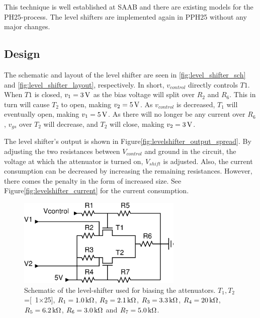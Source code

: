 		This technique is well established at SAAB and there are existing models for the PH25-process\autocite{gustavsson07}. The level shifters are implemented again in PPH25 without any major changes.
		
	\subsection{Design}
		The schematic and layout of the level shifter are seen in \autoref{fig:level_shifter_sch} and \autoref{fig:level_shifter_layout}, respectively.
		In short, $v_{control}$  directly controls $T1$. When $T1$ is closed, $v_1=\unit[3]{V}$ as the bias voltage will split over $R_2$ and $R_6$. This in turn will cause $T_2$ to open, making  $v_2=\unit[5]{V}$. As $v_{control}$ is decreased, $T_1$ will eventually open, making $v_1=\unit[5]{V}$. As there will no longer be any current over $R_6$, $v_{gs}$ over $T_2$ will decrease, and $T_2$ will close, making $v_2=\unit[3]{V}$.
		
		The level shifter's output is shown in Figure\autoref{fig:levelshifter_output_spread}. By adjusting the two resistances between $V_{control}$ and ground in the circuit, the voltage at which the attenuator is turned on, $V_{shift}$ is adjusted. Also, the current consumption can be decreased by increasing the remaining resistances. However, there comes the penalty in the form of increased size. See Figure\autoref{fig:levelshifter_current} for the current consumption.


		\begin{figure}[h!]
			\centering
			\includegraphics[width=0.7\textwidth]{fig/attenuators/sch_level_shifter}
			\caption[Level-shifter schematic layout]{Schematic of the level-shifter used for biasing the attenuators. $T_1,T_2$=\unit[1$\times$25]{\mum}, $R_1=\unit[1.0]{k\Omega}$, $R_2=\unit[2.1]{k\Omega}$, $R_3=\unit[3.3]{k\Omega}$, $R_4=\unit[20]{k\Omega}$, $R_5=\unit[6.2]{k\Omega}$, $R_6=\unit[3.0]{k\Omega}$ and $R_7=\unit[5.0]{k\Omega}$.}\label{fig:level_shifter_sch}
		\end{figure}
		
